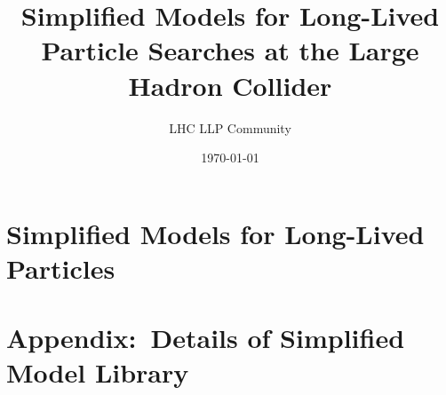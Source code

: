 \documentclass[a4paper,debug,notitlepage,nobib]{tufte-book}
\title{Simplified Models for Long-Lived Particle Searches at the Large \\ 
\smallskip \noindent Hadron Collider}
\author{LHC LLP Community}
\date{\today}
\begin{document}
\setcounter{secnumdepth}{3} %



\setcounter{tocdepth}{1}
\tableofcontents
 

\chapter{Simplified Models for Long-Lived Particles}


\appendix



\chapter{Appendix:~Details of Simplified Model Library}
\label{sec:library_more}


%

%

%
% 
%
%
%
%
%
\printbibliography
\end{document}
